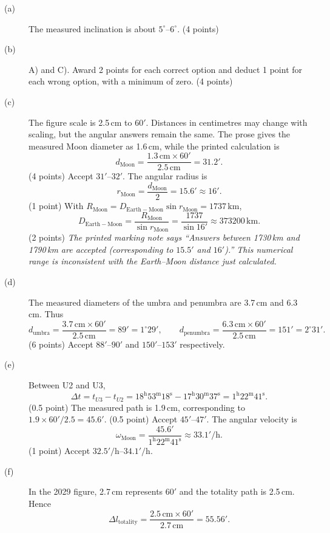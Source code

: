\begin{description}
\item[(a)] The measured inclination is about $5^\circ$--$6^\circ$. \hfill(4 points)
\item[(b)] A) and C). Award 2 points for each correct option and deduct 1 point for each wrong option, with a minimum of zero. \hfill(4 points)
\item[(c)] The figure scale is 2.5\,cm to $60'$. Distances in centimetres may change with scaling, but the angular answers remain the same. The prose gives the measured Moon diameter as 1.6\,cm, while the printed calculation is
\[
d_{\mathrm{Moon}}=\frac{1.3\,\mathrm{cm}\times60'}{2.5\,\mathrm{cm}}=31.2'.
\]\hfill(4 points)
Accept $31'$--$32'$. The angular radius is
\[
r_{\mathrm{Moon}}=\frac{d_{\mathrm{Moon}}}{2}=15.6'\approx16'.
\]\hfill(1 point)
With $R_{\mathrm{Moon}}=D_{\mathrm{Earth-Moon}}\sin r_{\mathrm{Moon}}=1737\,\mathrm{km}$,
\[
D_{\mathrm{Earth-Moon}}=\frac{R_{\mathrm{Moon}}}{\sin r_{\mathrm{Moon}}}=\frac{1737}{\sin16'}\approx373200\,\mathrm{km}.
\]\hfill(2 points)
\textit{The printed marking note says ``Answers between 1730\,km and 1790\,km are accepted (corresponding to $15.5'$ and $16'$).'' This numerical range is inconsistent with the Earth--Moon distance just calculated.}
\item[(d)] The measured diameters of the umbra and penumbra are 3.7\,cm and 6.3\,cm. Thus
\[
d_{\mathrm{umbra}}=\frac{3.7\,\mathrm{cm}\times60'}{2.5\,\mathrm{cm}}=89'=1^\circ29',\qquad
 d_{\mathrm{penumbra}}=\frac{6.3\,\mathrm{cm}\times60'}{2.5\,\mathrm{cm}}=151'=2^\circ31'.
\]\hfill(6 points)
Accept $88'$--$90'$ and $150'$--$153'$ respectively.
\item[(e)] Between U2 and U3,
\[
\Delta t=t_{U3}-t_{U2}=18^{\mathrm h}53^{\mathrm m}18^{\mathrm s}-17^{\mathrm h}30^{\mathrm m}37^{\mathrm s}=1^{\mathrm h}22^{\mathrm m}41^{\mathrm s}.
\]\hfill(0.5 point)
The measured path is 1.9\,cm, corresponding to $1.9\times60'/2.5=45.6'$. \hfill(0.5 point)
Accept $45'$--$47'$. The angular velocity is
\[
\omega_{\mathrm{Moon}}=\frac{45.6'}{1^{\mathrm h}22^{\mathrm m}41^{\mathrm s}}\approx33.1'/\mathrm h.
\]\hfill(1 point)
Accept $32.5'/\mathrm h$--$34.1'/\mathrm h$.
\item[(f)] In the 2029 figure, 2.7\,cm represents $60'$ and the totality path is 2.5\,cm. Hence
\[
\Delta l_{\mathrm{totality}}=\frac{2.5\,\mathrm{cm}\times60'}{2.7\,\mathrm{cm}}=55.56'.
\]
\end{description}
